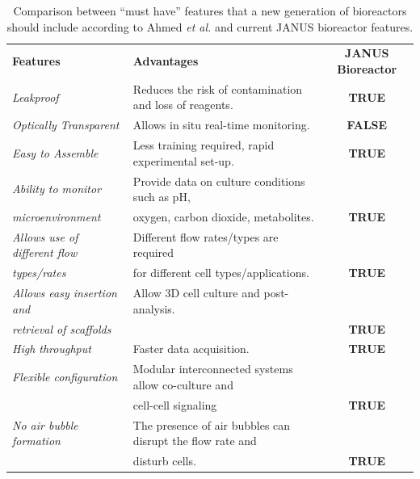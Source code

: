\begin{table}[ht]
\caption{Comparison between “must have” features that a new generation of bioreactors should include according to Ahmed \textit{et al.} \cite{Ahmed2019-uk} and current JANUS bioreactor features.}
\bigskip
\scriptsize
\centering
\begin{tabularx}{370px}{l l c} \toprule[0.15em]
\textbf{Features} & \textbf{Advantages} & \textbf{JANUS Bioreactor} \\ \cmidrule(l){1-3}
\rowcolor[HTML]{EEEEEE} 
\textit{Leakproof} & Reduces the risk of contamination and loss of reagents. & {\color[HTML]{38761D} \textbf{TRUE}}  \\
\rowcolor[HTML]{FFFFFF} 
\textit{Optically Transparent} & Allows in situ real-time monitoring. & {\color[HTML]{FF0000} \textbf{FALSE}} \\
\rowcolor[HTML]{EEEEEE} 
\textit{Easy to Assemble} & Less training required, rapid experimental set-up. & {\color[HTML]{38761D} \textbf{TRUE}}  \\
\rowcolor[HTML]{FFFFFF} 
\textit{Ability to monitor} & Provide data on culture conditions such as pH, & \\ 
\textit{microenvironment} & oxygen, carbon dioxide, metabolites. & {\color[HTML]{38761D} \textbf{TRUE}} \\
\rowcolor[HTML]{EEEEEE} 
\textit{Allows use of different flow} & Different flow rates/types are required & \\
\rowcolor[HTML]{EEEEEE} 
\textit{types/rates} & for different cell types/applications. & {\color[HTML]{38761D} \textbf{TRUE}} \\
\rowcolor[HTML]{FFFFFF} 
\textit{Allows easy insertion and} & Allow 3D cell culture and post-analysis. & \\
\textit{retrieval of scaffolds} & & {\color[HTML]{38761D} \textbf{TRUE}} \\ 
\rowcolor[HTML]{EEEEEE} 
\textit{High throughput} & Faster data acquisition. & {\color[HTML]{38761D} \textbf{TRUE}} \\ 
\rowcolor[HTML]{FFFFFF} 
\textit{Flexible configuration} & Modular interconnected systems allow co-culture and & \\
& cell-cell signaling & {\color[HTML]{38761D} \textbf{TRUE}}  \\
\rowcolor[HTML]{EEEEEE} 
\textit{No air bubble formation} & The presence of air bubbles can disrupt the flow rate and  & \\
\rowcolor[HTML]{EEEEEE} 
 & disturb cells. & {\color[HTML]{38761D} \textbf{TRUE}}  \\ \bottomrule[0.15em] 
\end{tabularx}
\label{tabBioreactor}
\end{table}


